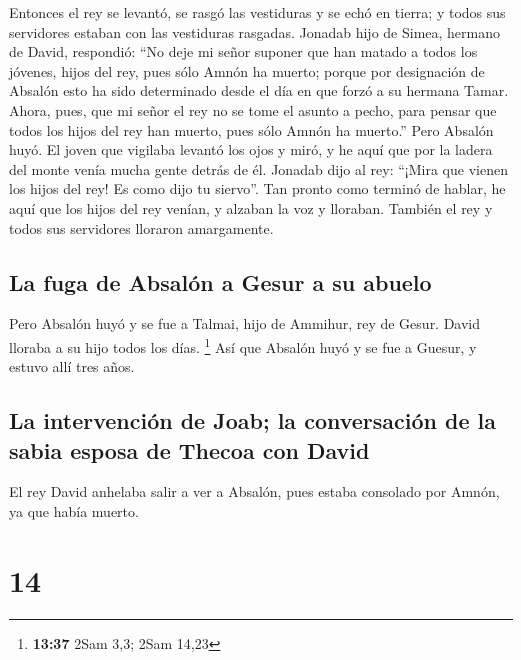  Entonces el rey se levantó, se rasgó las vestiduras y se
echó en tierra; y todos sus servidores estaban con las vestiduras
rasgadas.  Jonadab hijo de Simea, hermano de David,
respondió: ``No deje mi señor suponer que han matado a todos los
jóvenes, hijos del rey, pues sólo Amnón ha muerto; porque por
designación de Absalón esto ha sido determinado desde el día en que
forzó a su hermana Tamar.  Ahora, pues, que mi señor el
rey no se tome el asunto a pecho, para pensar que todos los hijos del
rey han muerto, pues sólo Amnón ha muerto.''  Pero
Absalón huyó. El joven que vigilaba levantó los ojos y miró, y he aquí
que por la ladera del monte venía mucha gente detrás de él.
 Jonadab dijo al rey: ``¡Mira que vienen los hijos del
rey! Es como dijo tu siervo''.  Tan pronto como terminó
de hablar, he aquí que los hijos del rey venían, y alzaban la voz y
lloraban. También el rey y todos sus servidores lloraron amargamente.

\hypertarget{la-fuga-de-absaluxf3n-a-gesur-a-su-abuelo}{%
\subsection{La fuga de Absalón a Gesur a su
abuelo}\label{la-fuga-de-absaluxf3n-a-gesur-a-su-abuelo}}

 Pero Absalón huyó y se fue a Talmai, hijo de Ammihur,
rey de Gesur. David lloraba a su hijo todos los días. \footnote{\textbf{13:37}
  2Sam 3,3; 2Sam 14,23}  Así que Absalón huyó y se fue a
Guesur, y estuvo allí tres años.

\hypertarget{la-intervenciuxf3n-de-joab-la-conversaciuxf3n-de-la-sabia-esposa-de-thecoa-con-david}{%
\subsection{La intervención de Joab; la conversación de la sabia esposa
de Thecoa con
David}\label{la-intervenciuxf3n-de-joab-la-conversaciuxf3n-de-la-sabia-esposa-de-thecoa-con-david}}

 El rey David anhelaba salir a ver a Absalón, pues estaba
consolado por Amnón, ya que había muerto.

\hypertarget{section-13}{%
\section{14}\label{section-13}}

